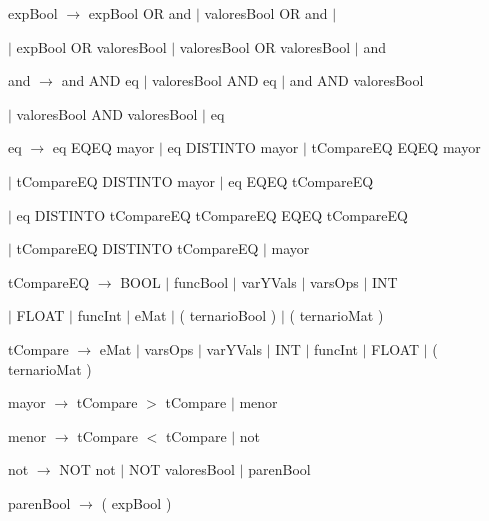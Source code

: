  expBool $\rightarrow$ expBool OR and $|$ valoresBool OR and $|$
 
 \hspace{15mm}$|$ expBool OR valoresBool $|$ valoresBool OR valoresBool $|$ and
  
 and $\rightarrow$ and AND eq $|$ valoresBool AND eq $|$ and AND valoresBool 
 
 \hspace{15mm}$|$ valoresBool AND valoresBool $|$ eq

 eq $\rightarrow$ eq EQEQ mayor $|$ eq DISTINTO mayor $|$ tCompareEQ EQEQ mayor 
 
 \hspace{15mm} $|$ tCompareEQ DISTINTO mayor $|$ eq EQEQ tCompareEQ  
 
 \hspace{15mm} $|$ eq DISTINTO tCompareEQ  tCompareEQ EQEQ tCompareEQ 
 
 \hspace{15mm} $|$ tCompareEQ DISTINTO tCompareEQ $|$ mayor
  
 
 tCompareEQ $\rightarrow$ BOOL $|$ funcBool $|$ varYVals $|$ varsOps $|$ INT
  
 \hspace{15mm} $|$ FLOAT $|$ funcInt $|$ eMat $|$ ( ternarioBool )  $|$ ( ternarioMat )
  
  
  tCompare $\rightarrow$ eMat $|$ varsOps $|$ varYVals $|$ INT $|$ funcInt  $|$ FLOAT $|$ ( ternarioMat ) 
  
  mayor  $\rightarrow$ tCompare $>$ tCompare $|$ menor
  
  menor  $\rightarrow$ tCompare $<$ tCompare $|$ not
  
   not  $\rightarrow$  NOT not $|$ NOT valoresBool $|$ parenBool
  
  parenBool  $\rightarrow$ ( expBool ) 
  
  
